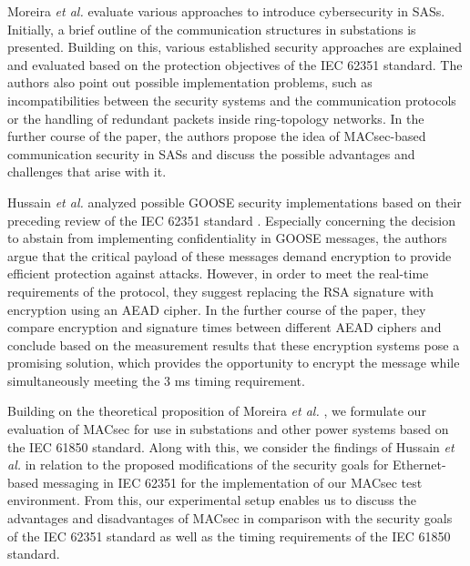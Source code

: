 \documentclass[conference, onecolumn, a4paper]{IEEEtran}
\begin{document}
\smallskip
Moreira \textit{et al.} \cite{Cybersecurity_Substation:2016} evaluate various approaches to introduce cybersecurity in SASs. Initially, a brief outline 
of the communication structures in substations is presented. Building on this, various established security approaches are explained and evaluated based 
on the protection objectives of the IEC 62351 standard. The authors also point out possible implementation problems, such as incompatibilities between 
the security systems and the communication protocols or the handling of redundant packets inside ring-topology networks. In the further course of the 
paper, the authors propose the idea of MACsec-based communication security in SASs and discuss the possible advantages and challenges that arise with it. 

\smallskip
Hussain \textit{et al.} \cite{GOOSE_confidentiality_integrity:2020} analyzed possible GOOSE security implementations based on their preceding review 
of the IEC 62351 standard \cite{Review_IEC62351:2019}. Especially concerning the decision to abstain from implementing confidentiality in GOOSE messages, 
the authors argue that the critical payload of these messages demand encryption to provide efficient protection against attacks. However, in order to 
meet the real-time requirements of the protocol, they suggest replacing the RSA signature with encryption using an AEAD cipher. In the further course 
of the paper, they compare encryption and signature times between different AEAD ciphers and conclude based on the measurement results that these encryption 
systems pose a promising solution, which provides the opportunity to encrypt the message while simultaneously  meeting the 3 ms timing requirement.

\smallskip 
Building on the theoretical proposition of Moreira \textit{et al.} \cite{Cybersecurity_Substation:2016}, we formulate our evaluation of MACsec for use in 
substations and other power systems based on the IEC 61850 standard. Along with this, we consider the findings of Hussain \textit{et al.} \cite{Review_IEC62351:2019} 
in relation to the proposed modifications of the security goals for Ethernet-based messaging in IEC 62351 for the implementation of our MACsec test environment. 
From this, our experimental setup enables us to discuss the advantages and disadvantages of MACsec in comparison with the security goals of the IEC 62351 
standard as well as the timing requirements of the IEC 61850 standard. 

\end{document}
